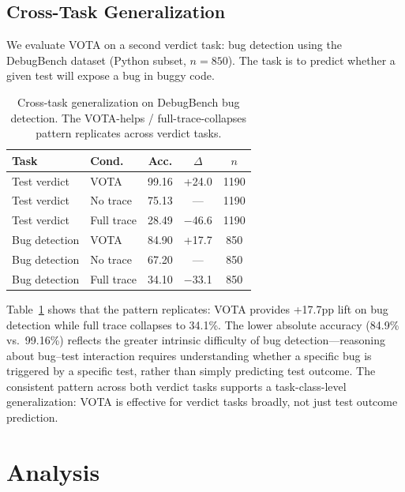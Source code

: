 \documentclass[11pt,a4paper]{article}
\begin{document}
\subsection{Cross-Task Generalization}

We evaluate VOTA on a second verdict task: bug detection using the DebugBench dataset (Python subset, $n = 850$). The task is to predict whether a given test will expose a bug in buggy code.

\begin{table}[t]
\centering
\small
\begin{tabular}{llccc}
\toprule
\textbf{Task} & \textbf{Cond.} & \textbf{Acc.} & \textbf{$\Delta$} & \textbf{$n$} \\
\midrule
Test verdict & VOTA & 99.16 & +24.0 & 1190 \\
Test verdict & No trace & 75.13 & --- & 1190 \\
Test verdict & Full trace & 28.49 & $-$46.6 & 1190 \\
\midrule
Bug detection & VOTA & 84.90 & +17.7 & 850 \\
Bug detection & No trace & 67.20 & --- & 850 \\
Bug detection & Full trace & 34.10 & $-$33.1 & 850 \\
\bottomrule
\end{tabular}
\caption{Cross-task generalization on DebugBench bug detection. The VOTA-helps / full-trace-collapses pattern replicates across verdict tasks.}
\label{tab:crosstask}
\end{table}

Table~\ref{tab:crosstask} shows that the pattern replicates: VOTA provides +17.7pp lift on bug detection while full trace collapses to 34.1\%. The lower absolute accuracy (84.9\% vs.\ 99.16\%) reflects the greater intrinsic difficulty of bug detection---reasoning about bug--test interaction requires understanding whether a specific bug is triggered by a specific test, rather than simply predicting test outcome. The consistent pattern across both verdict tasks supports a task-class-level generalization: VOTA is effective for verdict tasks broadly, not just test outcome prediction.

\section{Analysis}
\end{document}
